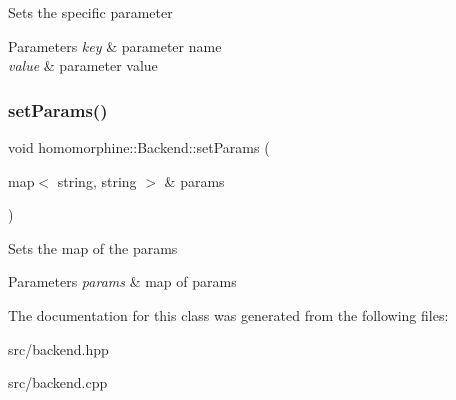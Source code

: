 Sets the specific parameter


\begin{DoxyParams}{Parameters}
{\em key} & parameter name \\
\hline
{\em value} & parameter value \\
\hline
\end{DoxyParams}
\mbox{\label{classhomomorphine_1_1_backend_aed04b9aa4eb2c08801e099b16b4da4b0}} 
\subsubsection{\texorpdfstring{set\+Params()}{setParams()}}
{\footnotesize\ttfamily void homomorphine\+::\+Backend\+::set\+Params (\begin{DoxyParamCaption}\item[{map$<$ string, string $>$ \&}]{params }\end{DoxyParamCaption})}

Sets the map of the params


\begin{DoxyParams}{Parameters}
{\em params} & map of params \\
\hline
\end{DoxyParams}


The documentation for this class was generated from the following files\+:\begin{DoxyCompactItemize}
\item 
src/backend.\+hpp\item 
src/backend.\+cpp\end{DoxyCompactItemize}
